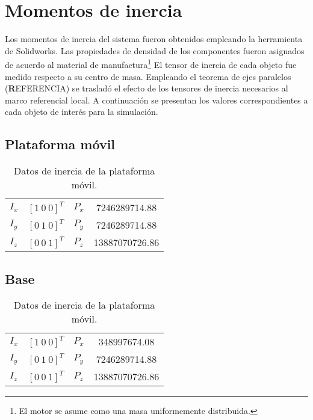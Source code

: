 \section{Momentos de inercia}

Los momentos de inercia del sistema fueron obtenidos
empleando la herramienta de Solidworks. 
Las propiedades de densidad de los componentes fueron asignados de acuerdo al material de manufactura\footnote{El motor se asume como una masa uniformemente distribuida.}
El tensor de inercia de cada objeto fue medido respecto a su centro de masa.
Empleando el teorema de ejes paralelos (\textbf REFERENCIA) se trasladó el efecto de los tensores de inercia necesarios al marco referencial local.
A continuación se presentan los valores correspondientes a cada objeto de interés para la simulación.



\subsection{Plataforma móvil}

% 

\begin{table}[hb!]
 \begin{center}
\begin{tabular}{lclc}
 $ I_x $ & $ [1 \ 0 \ 0]^T $ & $ P_x $ & 7246289714.88\\
 $ I_y $ & $ [0 \ 1 \ 0]^T $ & $ P_y $ & 7246289714.88\\
 $ I_z $ & $ [0 \ 0 \ 1]^T $ & $ P_z $ & 13887070726.86
\end{tabular}
\end{center}
\caption{Datos de inercia de la plataforma móvil.}
\end{table}


\subsection{Base}

% 

\begin{table}[hb!]
 \begin{center}
\begin{tabular}{lclc}
 $ I_x $ & $ [1 \ 0 \ 0]^T $ & $ P_x $ & 348997674.08\\
 $ I_y $ & $ [0 \ 1 \ 0]^T $ & $ P_y $ & 7246289714.88\\
 $ I_z $ & $ [0 \ 0 \ 1]^T $ & $ P_z $ & 13887070726.86
\end{tabular}
\end{center}
\caption{Datos de inercia de la plataforma móvil.}
\end{table}

